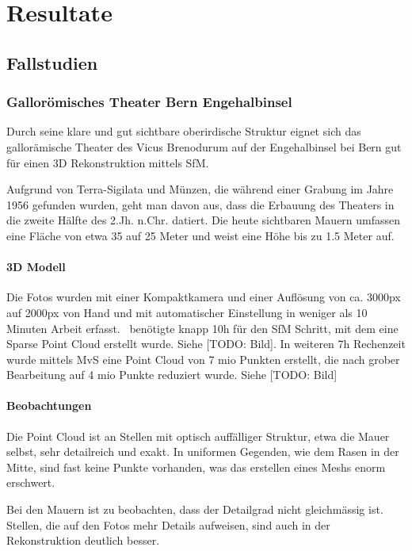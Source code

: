 \chapter{Resultate}

	\section{Fallstudien}\label{res:fall}
		
		\subsection{Gallorömisches Theater Bern Engehalbinsel}
			Durch seine klare und gut sichtbare oberirdische Struktur eignet sich das gallorämische Theater des Vicus Brenodurum auf der Engehalbinsel bei Bern gut für einen 3D Rekonstruktion mittels SfM.
			
			Aufgrund von Terra-Sigilata und Münzen, die während einer Grabung im Jahre 1956 gefunden wurden, geht man davon aus, dass die Erbauung des Theaters in die zweite Hälfte des 2.Jh. n.Chr. datiert. Die heute sichtbaren Mauern umfassen eine Fläche von etwa 35 auf 25 Meter und weist eine Höhe bis zu 1.5 Meter auf.
				
							
			\subsubsection{3D Modell}
				Die Fotos wurden mit einer Kompaktkamera und einer Auflösung von ca. 3000px auf 2000px von Hand und mit automatischer Einstellung in weniger als 10 Minuten Arbeit erfasst.
				\dronarch\ benötigte knapp 10h für den SfM Schritt, mit dem eine Sparse Point Cloud erstellt wurde. Siehe [TODO: Bild].
				In weiteren 7h Rechenzeit wurde mittels MvS eine Point Cloud von 7 mio Punkten erstellt, die nach grober Bearbeitung auf 4 mio Punkte reduziert wurde. Siehe [TODO: Bild]

			\subsubsection{Beobachtungen}
				Die Point Cloud ist an Stellen mit optisch auffälliger Struktur, etwa die Mauer selbst, sehr detailreich und exakt. In uniformen Gegenden, wie dem Rasen in der Mitte, sind fast keine Punkte vorhanden, was das erstellen eines Meshs enorm erschwert.
				
				Bei den Mauern ist zu beobachten, dass der Detailgrad nicht gleichmässig ist. Stellen, die auf den Fotos mehr Details aufweisen, sind auch in der Rekonstruktion deutlich besser.
				
